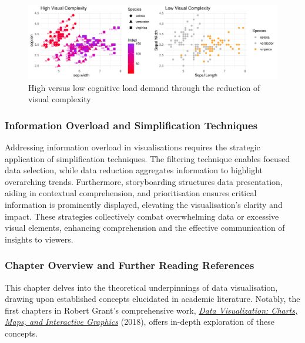 \documentclass{article}\usepackage[]{graphicx}\usepackage[]{xcolor}
\makeatletter
\def\maxwidth{ %
  \ifdim\Gin@nat@width>\linewidth
    \linewidth
  \else
    \Gin@nat@width
  \fi
}
\newenvironment{knitrout}{}{} %
\numberwithin{equation}{section}
\makeatother
\begin{document}
\begin{knitrout}\scriptsize
{}\color{fgcolor}\begin{figure}[H]

{\centering \includegraphics[width=\maxwidth]{figure/beamer-cogload-plot-1} 

}

\caption[High versus low cognitive load demand through the reduction of visual complexity]{High versus low cognitive load demand through the reduction of visual complexity}\label{fig:cogload-plot}
\end{figure}

\end{knitrout}

\subsubsection{Information Overload and Simplification Techniques}
Addressing information overload in visualisations requires the strategic application of simplification techniques. The filtering technique enables focused data selection, while data reduction aggregates information to highlight overarching trends. Furthermore, storyboarding structures data presentation, aiding in contextual comprehension, and prioritisation ensures critical information is prominently displayed, elevating the visualisation's clarity and impact. These strategies collectively combat overwhelming data or excessive visual elements, enhancing comprehension and the effective communication of insights to viewers.

\subsubsection*{Chapter Overview and Further Reading References}

\noindent This chapter delves into the theoretical underpinnings of data visualisation, drawing upon established concepts elucidated in academic literature. Notably, the first chapters in Robert Grant's comprehensive work, \href{https://www.taylorfrancis.com/books/mono/10.1201/9781315201351/data-visualization-robert-grant}{\textit{Data Visualization: Charts, Maps, and Interactive Graphics}} (2018), offers in-depth exploration of these concepts.
\end{document}
